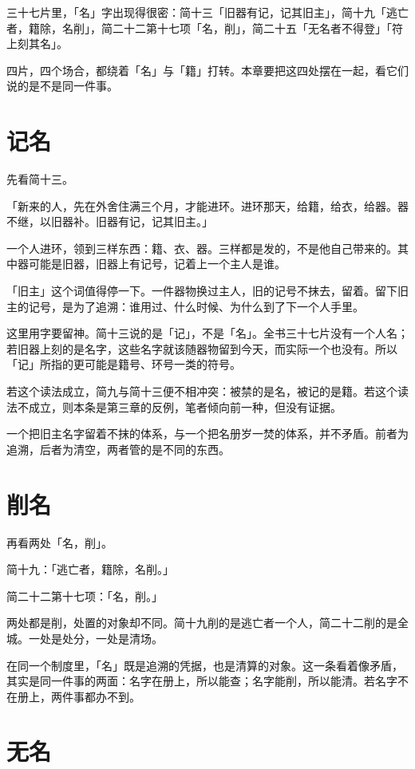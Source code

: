 三十七片里，「名」字出现得很密：简十三「旧器有记，记其旧主」，简十九「逃亡者，籍除，名削」，简二十二第十七项「名，削」，简二十五「无名者不得登」「符上刻其名」。

四片，四个场合，都绕着「名」与「籍」打转。本章要把这四处摆在一起，看它们说的是不是同一件事。

\section{记名}

先看简十三。

「新来的人，先在外舍住满三个月，才能进环。进环那天，给籍，给衣，给器。器不继，以旧器补。旧器有记，记其旧主。」

一个人进环，领到三样东西：籍、衣、器。三样都是发的，不是他自己带来的。其中器可能是旧器，旧器上有记号，记着上一个主人是谁。

「旧主」这个词值得停一下。一件器物换过主人，旧的记号不抹去，留着。留下旧主的记号，是为了追溯：谁用过、什么时候、为什么到了下一个人手里。

这里用字要留神。简十三说的是「记」，不是「名」。全书三十七片没有一个人名；若旧器上刻的是名字，这些名字就该随器物留到今天，而实际一个也没有。所以「记」所指的更可能是籍号、环号一类的符号。

若这个读法成立，简九与简十三便不相冲突：被禁的是名，被记的是籍。若这个读法不成立，则本条是第三章的反例，笔者倾向前一种，但没有证据。

一个把旧主名字留着不抹的体系，与一个把名册岁一焚的体系，并不矛盾。前者为追溯，后者为清空，两者管的是不同的东西。

\section{削名}

再看两处「名，削」。

简十九：「逃亡者，籍除，名削。」

简二十二第十七项：「名，削。」

两处都是削，处置的对象却不同。简十九削的是逃亡者一个人，简二十二削的是全城。一处是处分，一处是清场。

在同一个制度里，「名」既是追溯的凭据，也是清算的对象。这一条看着像矛盾，其实是同一件事的两面：名字在册上，所以能查；名字能削，所以能清。若名字不在册上，两件事都办不到。

\section{无名}

